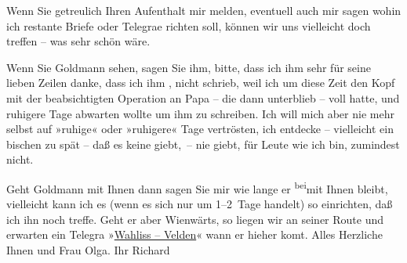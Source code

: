 \pstart
           {\pb}Wenn Sie getreulich Ihren
               Aufenthalt mir melden, eventuell auch mir sagen wohin ich restante Briefe oder
                  Telegra{\geminationm}e richten soll, können wir uns vielleicht doch treffen – was sehr schön wäre.\pend
           
\pstart
           {\pb}Wenn Sie Goldmann sehen, sagen Sie ihm, bitte, dass ich ihm sehr für
               seine lieben Zeilen danke, dass ich ihm \label{K_L01701-1v}\label{K_L01701-1}, nicht schrieb, weil ich um diese Zeit den Kopf mit der beabsichtigten
               Operation an Papa – die dann
               unterblieb – voll hatte, und ruhigere Tage abwarten wollte um ihm zu schreiben. Ich
               will mich aber nie mehr selbst auf »ruhige« oder »ruhigere« Tage vertrösten, ich {\pb}entdecke – vielleicht ein bischen
               zu spät – daß es keine giebt, – nie giebt, für Leute wie ich bin, zumindest
               nicht.\pend
           
\pstart
           Geht Goldmann mit Ihnen dann sagen Sie mir wie
               lange er \substVorne{}\textsuperscript{bei}\substDazwischen{}mit\substHinten{} Ihnen bleibt, vielleicht kann ich es (wenn {\pb}es sich nur um 1–2 Tage handelt) so
               einrichten, daß ich ihn noch treffe. Geht er aber Wienwärts, so liegen wir an seiner Route und erwarten ein Telegra{\geminationm} »\uline{Wahliss – Velden}« wann er hieher ko{\geminationm}mt. Alles Herzliche Ihnen und
               Frau Olga.\pend
           \pstart Ihr \spacefill\mbox{Richard}\pend{}\endnumbering{}  
      